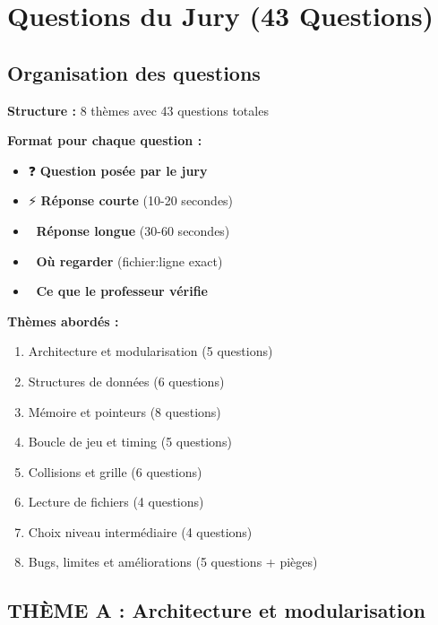\documentclass[12pt,a4paper]{article}
\begin{document}
\newpage

\section{Questions du Jury (43 Questions)}

\subsection{Organisation des questions}

\begin{tcolorbox}[colback=primaryblue!10, colframe=primaryblue, boxrule=2pt]
\textbf{Structure :} 8 thèmes avec 43 questions totales

\textbf{Format pour chaque question :}
\begin{itemize}
    \item ❓ \textbf{Question posée par le jury}
    \item ⚡ \textbf{Réponse courte} (10-20 secondes)
    \item 📖 \textbf{Réponse longue} (30-60 secondes)
    \item 📂 \textbf{Où regarder} (fichier:ligne exact)
    \item 🎯 \textbf{Ce que le professeur vérifie}
\end{itemize}
\end{tcolorbox}

\vspace{0.5cm}

\textbf{Thèmes abordés :}
\begin{enumerate}
    \item Architecture et modularisation (5 questions)
    \item Structures de données (6 questions)
    \item Mémoire et pointeurs (8 questions)
    \item Boucle de jeu et timing (5 questions)
    \item Collisions et grille (6 questions)
    \item Lecture de fichiers (4 questions)
    \item Choix niveau intermédiaire (4 questions)
    \item Bugs, limites et améliorations (5 questions + pièges)
\end{enumerate}

\newpage

\subsection{THÈME A : Architecture et modularisation}
\end{document}
